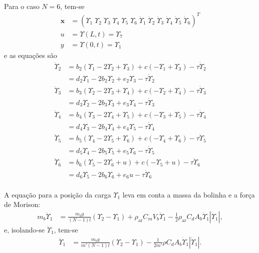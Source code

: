\documentclass[a4paper,11pt]{scrartcl} %
\numberwithin{equation}{section} %
\numberwithin{figure}{section} %
\numberwithin{table}{section} %
\begin{document}
\paragraph{} Para o caso $N=6$, tem-se \begin{align}
\mathbf{x} &= \left(\Upsilon_1\;\Upsilon_2\;\Upsilon_3\;\Upsilon_4\;\Upsilon_5\;\Upsilon_6\;\dot{\Upsilon}_1\;\dot{\Upsilon}_2\;\dot{\Upsilon}_3\;\dot{\Upsilon}_4\;\dot{\Upsilon}_5\;\dot{\Upsilon}_6\right)^T 	\\
u &= \Upsilon(L,t) = \Upsilon_7\label{ufor6}\\
y &= \Upsilon(0,t) = \Upsilon_1\label{yfor6}
 \end{align} e as equações são \begin{align}
 	\ddot{\Upsilon}_2 &=  b_2\left(\Upsilon_{1}-2\Upsilon_{2} + \Upsilon_{3}\right)+c(-\Upsilon_1 + \Upsilon_3)-\tau \dot{\Upsilon}_2\nonumber \\
 	&= d_2\Upsilon_1 - 2b_2 \Upsilon_2 + e_2\Upsilon_3 - \tau \dot{\Upsilon}_2\\
 	\ddot{\Upsilon}_3 &=  b_3\left(\Upsilon_{2}-2\Upsilon_{3} + \Upsilon_{4}\right)+c(-\Upsilon_2 + \Upsilon_4)-\tau \dot{\Upsilon}_3\nonumber \\
 	&= d_3\Upsilon_2 - 2b_3 \Upsilon_3 + e_3\Upsilon_4 - \tau \dot{\Upsilon}_3\\
 	\ddot{\Upsilon}_4 &=  b_4\left(\Upsilon_{3}-2\Upsilon_{4} + \Upsilon_{5}\right)+c(-\Upsilon_3 + \Upsilon_5)-\tau \dot{\Upsilon}_4 \nonumber\\
 	&= d_4\Upsilon_3 - 2b_4 \Upsilon_4 + e_4\Upsilon_5 - \tau \dot{\Upsilon}_4\\
 	\ddot{\Upsilon}_5 &=  b_5\left(\Upsilon_{4}-2\Upsilon_{5} + \Upsilon_{6}\right)+c(-\Upsilon_4 + \Upsilon_6)-\tau \dot{\Upsilon}_5\nonumber\\
 	&= d_5\Upsilon_4 - 2b_5 \Upsilon_5 + e_5\Upsilon_6 - \tau \dot{\Upsilon}_5\\
 	\ddot{\Upsilon}_6 &=  b_6\left(\Upsilon_{5}-2\Upsilon_{6} + u\right)+c(-\Upsilon_5 + u)-\tau \dot{\Upsilon}_6\nonumber\\
 	&= d_6\Upsilon_5 - 2b_6 \Upsilon_6 + e_6 u - \tau \dot{\Upsilon}_6
 \end{align}

 \paragraph{} A equação para a posição da carga $\Upsilon_1$ leva em conta a massa da bolinha e a força de Morison: \begin{align}
 	m_b \ddot{\Upsilon}_1 &= \frac{m_b g}{(N-1)l}\left(\Upsilon_2 - \Upsilon_1\right) + \rho_{\mathrm{ar}} C_m V_b \ddot{\Upsilon}_1 - \frac{1}{2}\rho_{\textrm{ar}} C_d A_b \dot{\Upsilon}_1 \left|\dot{\Upsilon}_1\right|,
 \end{align} e, isolando-se $\ddot{\Upsilon}_1$, tem-se \begin{align}
 	\ddot{\Upsilon}_1 &= \frac{m_b g}{m'(N-1)l}\left(\Upsilon_2 - \Upsilon_1\right)  - \frac{1}{2m'}\rho C_d A_b \dot{\Upsilon}_1 \left|\dot{\Upsilon}_1\right|.
 \end{align} 
 
\end{document}
